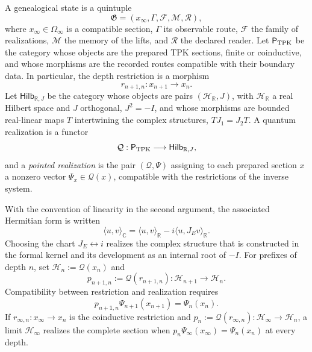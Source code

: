 \begin{definition}
\label{v:v:rec:realizacion_evolucion:statement:01}
A genealogical state is a quintuple
\begin{equation}
 \mathfrak G=(x_\infty,\Gamma,\mathcal F,\mathcal M,\mathcal R),
 \label{v:v:rec:eq:estado-genealogico-realizado-rev2}
\end{equation}
where \(x_\infty\in\Omega_\infty\) is a compatible section,
\(\Gamma\) its observable route, \(\mathcal F\) the family of realizations,
\(\mathcal M\) the memory of the lifts, and \(\mathcal R\) the declared
reader. Let \(\mathsf P_{\rm TPK}\) be the category whose objects are the
prepared TPK sections, finite or coinductive, and whose morphisms are the
recorded routes compatible with their boundary data. In particular, the
depth restriction is a morphism
\[
 r_{n+1,n}:x_{n+1}\longrightarrow x_n.
\]
Let \(\mathsf{Hilb}_{\mathbb R,J}\) be the category whose objects
are pairs \((\mathcal H_{\mathbb R},J)\), with \(\mathcal H_{\mathbb R}\)
a real Hilbert space and \(J\) orthogonal, \(J^2=-I\), and whose morphisms are
bounded real-linear maps \(T\) intertwining the complex
structures, \(TJ_1=J_2T\). A quantum realization is a functor
\[
 \mathcal Q:\mathsf P_{\rm TPK}\longrightarrow
 \mathsf{Hilb}_{\mathbb R,J},
\]
and a \emph{pointed realization} is the pair \((\mathcal Q,\Psi)\) assigning
to each prepared section \(x\) a nonzero vector
\(\Psi_x\in\mathcal Q(x)\), compatible with the restrictions of the inverse
system.
\end{definition}

With the convention of linearity in the second argument, the associated Hermitian form
is written
\[
 \langle u,v\rangle_{\mathbb C}
 =\langle u,v\rangle_{\mathbb R}
  -i\langle u,J_E v\rangle_{\mathbb R}.
\]
Choosing the chart \(J_E\leftrightarrow i\) realizes the complex structure that
is constructed in the formal kernel and its development as an internal root of \(-I\). For prefixes of
depth \(n\), set
\(\mathcal H_n:=\mathcal Q(x_n)\) and
\[
 p_{n+1,n}:=\mathcal Q(r_{n+1,n}):
 \mathcal H_{n+1}\longrightarrow\mathcal H_n.
\]
Compatibility between restriction and realization requires
\begin{equation}
 p_{n+1,n}\Psi_{n+1}(x_{n+1})=\Psi_n(x_n).
 \label{v:v:rec:eq:compatibilidad-realizacion-hilbert-rev2}
\end{equation}
If \(r_{\infty,n}:x_\infty\to x_n\) is the coinductive restriction and
\(p_n:=\mathcal Q(r_{\infty,n}):\mathcal H_\infty\to\mathcal H_n\), a
limit \(\mathcal H_\infty\) realizes the complete section when
\(p_n\Psi_\infty(x_\infty)=\Psi_n(x_n)\) at every depth.

